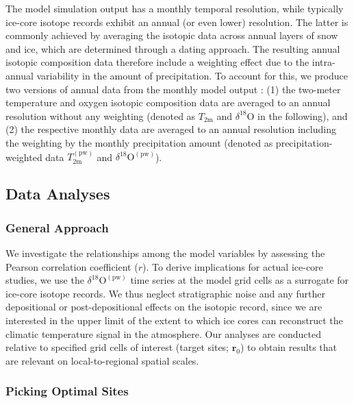 \documentclass[draft]{agujournal2019}
\begin{document}
The model simulation output has a monthly temporal resolution, while typically
ice-core isotope records exhibit an annual (or even lower) resolution. The
latter is commonly achieved by averaging the isotopic data across annual layers
of snow and ice, which are determined through a dating approach. The resulting
annual isotopic composition data therefore include a weighting effect due to the
intra-annual variability in the amount of precipitation. To account for this, we
produce two versions of annual data from the monthly model output
\cite{Munch2020}: (1) the two-meter temperature and oxygen isotopic composition
data are averaged to an annual resolution without any weighting (denoted as
$T_{2\mathrm{m}}$ and $\delta^{18}\mathrm{O}$ in the following), and (2) the
respective monthly data are averaged to an annual resolution including the
weighting by the monthly precipitation amount (denoted as precipitation-weighted
data $T_{2\mathrm{m}}^{\mathrm{(pw)}}$ and
$\delta^{18}\mathrm{O}^{\mathrm{(pw)}}$).

\subsection{Data Analyses}\label{methods:main}

\subsubsection{General Approach}\label{methods:general}

We investigate the relationships among the model variables by assessing the
Pearson correlation coefficient ($r$). To derive implications for actual
ice-core studies, we use the $\delta^{18}\mathrm{O}^{\mathrm{(pw)}}$ time series
at the model grid cells as a surrogate for ice-core isotope records. We thus
neglect stratigraphic noise and any further depositional or post-depositional
effects on the isotopic record, since we are interested in the upper limit of
the extent to which ice cores can reconstruct the climatic temperature signal in
the atmosphere. Our analyses are conducted relative to specified grid cells of
interest (target sites; $\mathbf{r}_0$) to obtain results that are relevant on
local-to-regional spatial scales.

\subsubsection{Picking Optimal Sites}\label{methods:picking}
\end{document}
